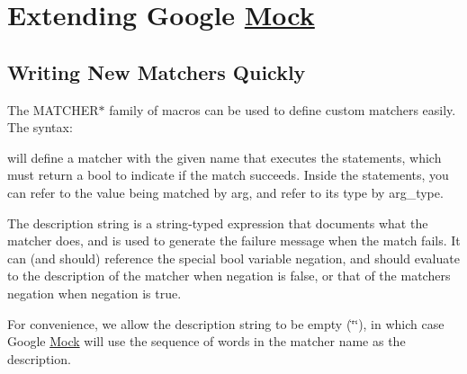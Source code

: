 \section*{Extending Google \mbox{\hyperlink{class_mock}{Mock}}}

\subsection*{Writing New Matchers Quickly}

The {\ttfamily M\+A\+T\+C\+H\+E\+R$\ast$} family of macros can be used to define custom matchers easily. The syntax\+:


\begin{DoxyCode}{0}
\end{DoxyCode}


will define a matcher with the given name that executes the statements, which must return a {\ttfamily bool} to indicate if the match succeeds. Inside the statements, you can refer to the value being matched by {\ttfamily arg}, and refer to its type by {\ttfamily arg\+\_\+type}.

The description string is a {\ttfamily string}-\/typed expression that documents what the matcher does, and is used to generate the failure message when the match fails. It can (and should) reference the special {\ttfamily bool} variable {\ttfamily negation}, and should evaluate to the description of the matcher when {\ttfamily negation} is {\ttfamily false}, or that of the matcher\textquotesingle{}s negation when {\ttfamily negation} is {\ttfamily true}.

For convenience, we allow the description string to be empty ({\ttfamily \char`\"{}\char`\"{}}), in which case Google \mbox{\hyperlink{class_mock}{Mock}} will use the sequence of words in the matcher name as the description.

